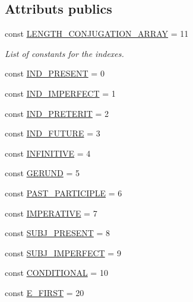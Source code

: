 \subsection*{Attributs publics}
\begin{DoxyCompactItemize}
\item 
const \hyperlink{class_conjugation_base_aa6a9ad231bf385e0bd9e240213facf36}{L\+E\+N\+G\+T\+H\+\_\+\+C\+O\+N\+J\+U\+G\+A\+T\+I\+O\+N\+\_\+\+A\+R\+R\+AY} = 11
\begin{DoxyCompactList}\small\item\em List of constants for the indexes. \end{DoxyCompactList}\item 
const \hyperlink{class_conjugation_base_a4b8516bbdb1525fc811738abeed0e1ff}{I\+N\+D\+\_\+\+P\+R\+E\+S\+E\+NT} = 0
\item 
const \hyperlink{class_conjugation_base_aff9c382a23aa5533dfed3be1f01a6b2f}{I\+N\+D\+\_\+\+I\+M\+P\+E\+R\+F\+E\+CT} = 1
\item 
const \hyperlink{class_conjugation_base_a479f338d318e0c399b20e66ecd7a03ad}{I\+N\+D\+\_\+\+P\+R\+E\+T\+E\+R\+IT} = 2
\item 
const \hyperlink{class_conjugation_base_ac25ac0244050e86a405bbf6fa9043a3e}{I\+N\+D\+\_\+\+F\+U\+T\+U\+RE} = 3
\item 
const \hyperlink{class_conjugation_base_abfe86b2588be8dc7fc44f29a4dae0641}{I\+N\+F\+I\+N\+I\+T\+I\+VE} = 4
\item 
const \hyperlink{class_conjugation_base_ace9d609af36ad729f01d6534c81caf4c}{G\+E\+R\+U\+ND} = 5
\item 
const \hyperlink{class_conjugation_base_aae5feaa02f682a7e2638f2bab47e6464}{P\+A\+S\+T\+\_\+\+P\+A\+R\+T\+I\+C\+I\+P\+LE} = 6
\item 
const \hyperlink{class_conjugation_base_ae4ec99d52ae2e6edd912cf67e78442bb}{I\+M\+P\+E\+R\+A\+T\+I\+VE} = 7
\item 
const \hyperlink{class_conjugation_base_a143faefe023f7f45d77ad739b8611d45}{S\+U\+B\+J\+\_\+\+P\+R\+E\+S\+E\+NT} = 8
\item 
const \hyperlink{class_conjugation_base_a530c57d644601e5430c7c3ffe064f705}{S\+U\+B\+J\+\_\+\+I\+M\+P\+E\+R\+F\+E\+CT} = 9
\item 
const \hyperlink{class_conjugation_base_aac0359d9a8bb66ea04612b7f14d43c50}{C\+O\+N\+D\+I\+T\+I\+O\+N\+AL} = 10
\item 
const \hyperlink{class_conjugation_base_ab0751622af68b3908a8c1426e42994e3}{E\+\_\+\+F\+I\+R\+ST} = 20
\item 

\end{DoxyCompactItemize}
